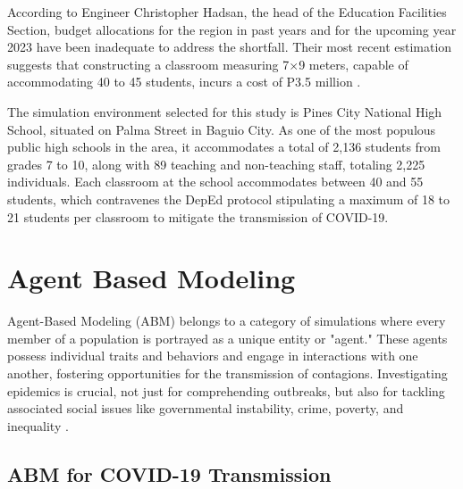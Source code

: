 According to Engineer Christopher Hadsan, the head of the Education Facilities Section, budget allocations for the region in past years and for the upcoming year 2023 have been inadequate to address the shortfall. Their most recent estimation suggests that constructing a classroom measuring 7×9 meters, capable of accommodating 40 to 45 students, incurs a cost of P3.5 million \cite{jones_2017_school}.

The simulation environment selected for this study is Pines City National High School, situated on Palma Street in Baguio City. As one of the most populous public high schools in the area, it accommodates a total of 2,136 students from grades 7 to 10, along with 89 teaching and non-teaching staff, totaling 2,225 individuals. Each classroom at the school accommodates between 40 and 55 students, which contravenes the DepEd protocol stipulating a maximum of 18 to 21 students per classroom to mitigate the transmission of COVID-19.

\section{Agent Based Modeling}

Agent-Based Modeling (ABM) belongs to a category of simulations where every member of a population is portrayed as a unique entity or "agent." These agents possess individual traits and behaviors and engage in interactions with one another, fostering opportunities for the transmission of contagions. Investigating epidemics is crucial, not just for comprehending outbreaks, but also for tackling associated social issues like governmental instability, crime, poverty, and inequality \cite{castiglione_2009_agent}.

\subsection{ABM for COVID-19 Transmission}

